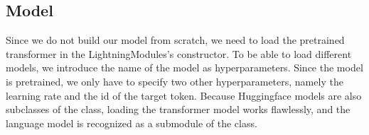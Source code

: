 \documentclass[letterpaper,10pt,english]{jupyterBook}
\begin{document}
\subsection{Model}
\label{\detokenize{PyTorchLightning:model}}
\sphinxAtStartPar
Since we do not build our model from scratch, we need to load the pretrained transformer in the LightningModules’s constructor.
To be able to load different models, we introduce the name of the model as hyperparameters.
Since the model is pretrained, we only have to specify two other hyperparameters, namely the learning rate and the id of the target token.
Because Huggingface models are also subclasses of the   class, loading the transformer model works flawlessly, and the language model is recognized as a submodule of the  class.
\begin{sphinxVerbatimInput}

\begin{sphinxVerbatim}[commandchars=\\\{\}]
 
      
          
            \PYG{p}{[}\PYG{p}{]}
\end{sphinxVerbatim}
\end{sphinxVerbatimInput}
\end{document}
